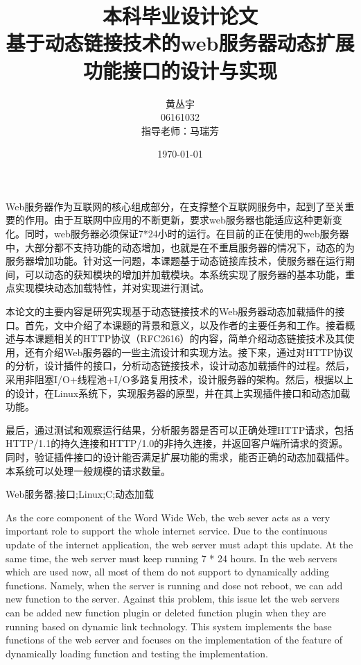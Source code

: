 \documentclass[12pt, twoside, a4paper, xetex]{report}
\begin{document}
\title{{\Huge 本科毕业设计论文\\}基于动态链接技术的web服务器动态扩展功能接口的设计与实现}
\author{黄丛宇\\06161032\\指导老师：马瑞芳}
\date{\today}

\lfour

\zhabstract 

Web服务器作为互联网的核心组成部分，在支撑整个互联网服务中，起到了至关重要的作用。由于互联网中应用的不断更新，要求web服务器也能适应这种更新变化。同时，web服务器必须保证7*24小时的运行。在目前的正在使用的web服务器中，大部分都不支持功能的动态增加，也就是在不重启服务器的情况下，动态的为服务器增加功能。针对这一问题，本课题基于动态链接库技术，使服务器在运行期间，可以动态的获知模块的增加并加载模块。本系统实现了服务器的基本功能，重点实现模块动态加载特性，并对实现进行测试。 

本论文的主要内容是研究实现基于动态链接技术的Web服务器动态加载插件的接口。首先，文中介绍了本课题的背景和意义，以及作者的主要任务和工作。接着概述与本课题相关的HTTP协议（RFC2616）的内容，简单介绍动态链接技术及其使用，还有介绍Web服务器的一些主流设计和实现方法。接下来，通过对HTTP协议的分析，设计插件的接口，分析动态链接技术，设计动态加载插件的过程。然后，采用非阻塞I/O+线程池+I/O多路复用技术，设计服务器的架构。然后，根据以上的设计，在Linux系统下，实现服务器的原型，并在其上实现插件接口和动态加载功能。

最后，通过测试和观察运行结果，分析服务器是否可以正确处理HTTP请求，包括HTTP/1.1的持久连接和HTTP/1.0的非持久连接，并返回客户端所请求的资源。同时，验证插件接口的设计能否满足扩展功能的需求，能否正确的动态加载插件。本系统可以处理一般规模的请求数量。

{\zhkeywords Web服务器;接口;Linux;C;动态加载}

\enabstract
	As the core component of the Word Wide Web, the web sever acts as a very important role to support the whole internet service. Due to the continuous update of the internet application, the web server must adapt this update. At the same time, the web server must keep running 7 * 24 hours. In the web servers which are used now, all most of them do not support to dynamically adding functions. Namely, when the server is running and dose not reboot, we can add new function to the server. Against this problem, this issue let the web servers can be added new function plugin or deleted function plugin when they are running based on dynamic link technology. This system implements the base functions of the web server and focuses on the implementation of the feature of dynamically loading function and testing the implementation.
	
\end{document}
